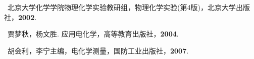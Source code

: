 \noindent [1]\ 北京大学化学学院物理化学实验教研组，物理化学实验(第4版)，北京大学出版社，\textbf{2002}.\par
\noindent [2]\ 贾梦秋，杨文胜. 应用电化学，高等教育出版社，\textbf{2004}.\par
\noindent [3]\ 胡会利，李宁主编，电化学测量，国防工业出版社，\textbf{2007}.\par